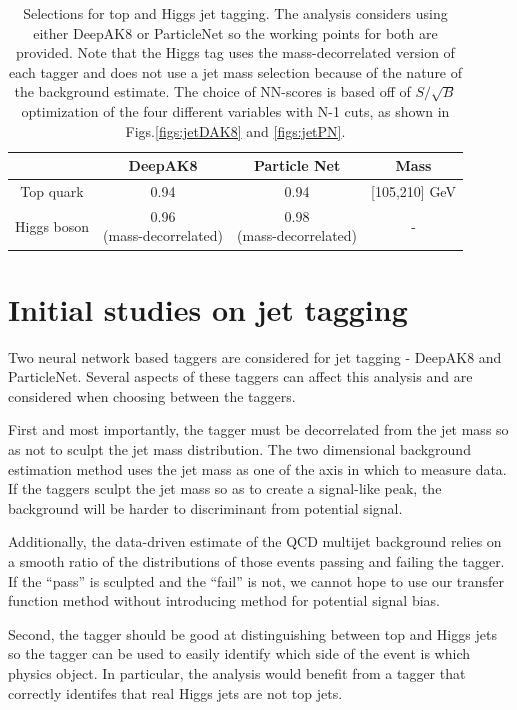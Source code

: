 \documentclass[10pt,oneside]{article}
\begin{document}
\begin{table}[H]
    \centering
    \begin{tabular}{c c c c}
         & DeepAK8 & Particle Net & Mass \\
        \hline
        Top quark & 0.94 & 0.94 & [105,210] GeV \\
        Higgs boson & \makecell{0.96\\(mass-decorrelated)} & \makecell{0.98\\(mass-decorrelated)} & - \\
    \end{tabular} 
    \caption{Selections for top and Higgs jet tagging. The analysis considers using either DeepAK8 or ParticleNet so
    the working points for both are provided. Note that the Higgs tag uses the mass-decorrelated version of each tagger
    and does not use a jet mass selection because of the nature of the background estimate. The choice of NN-scores
    is based off of $S/\sqrt{B}$ optimization of the four different variables with N-1 cuts, as shown in Figs.\ref{figs:jetDAK8} and \ref{figs:jetPN}.}
    \label{table:tags}
\end{table}


\section{Initial studies on jet tagging}
\label{sec:jets}
Two neural network based taggers are considered for jet tagging -
DeepAK8 and ParticleNet. Several aspects of these taggers can affect this
analysis and are considered when choosing between the taggers.

First and most importantly, the tagger must be decorrelated from the jet
mass so as not to sculpt the jet mass distribution. The two dimensional background
estimation method uses the jet mass as one of the axis in which to measure data.
If the taggers sculpt the jet mass so as to create a signal-like peak, the background
will be harder to discriminant from potential signal.

Additionally, the data-driven
estimate of the QCD multijet background relies on a smooth ratio of the distributions
of those events passing and failing the tagger. If the ``pass'' is sculpted and the ``fail''
is not, we cannot hope to use our transfer function method without introducing method
for potential signal bias.

Second, the tagger should be good at distinguishing between top and Higgs jets so the
tagger can be used to easily identify which side of the event is which physics object.
In particular, the analysis would benefit from a tagger that correctly identifes that 
real Higgs jets are not top jets.
\end{document}
